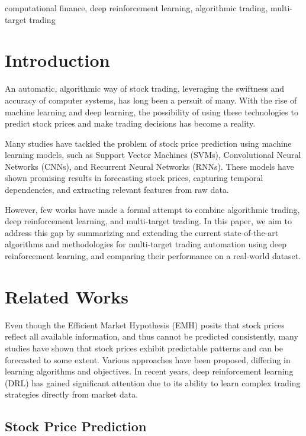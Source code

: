 \documentclass[conference]{IEEEtran}
\begin{document}
\begin{IEEEkeywords}
  computational finance, deep reinforcement learning, algorithmic trading, multi-target trading
\end{IEEEkeywords}

\section{Introduction}

An automatic, algorithmic way of stock trading, leveraging the swiftness and accuracy of computer systems, has long been a persuit of many. With the rise of machine learning and deep learning, the possibility of using these technologies to predict stock prices and make trading decisions has become a reality.

Many studies have tackled the problem of stock price prediction using machine learning models, such as Support Vector Machines (SVMs), Convolutional Neural Networks (CNNs), and Recurrent Neural Networks (RNNs). These models have shown promising results in forecasting stock prices, capturing temporal dependencies, and extracting relevant features from raw data.

However, few works have made a formal attempt to combine algorithmic trading, deep reinforcement learning, and multi-target trading. In this paper, we aim to address this gap by summarizing and extending the current state-of-the-art algorithms and methodologies for multi-target trading automation using deep reinforcement learning, and comparing their performance on a real-world dataset.

\section{Related Works}

Even though the Efficient Market Hypothesis (EMH) posits that stock prices reflect all available information, and thus cannot be predicted consistently, many studies have shown that stock prices exhibit predictable patterns and can be forecasted to some extent. Various approaches have been proposed, differing in learning algorithms and objectives. In recent years, deep reinforcement learning (DRL) has gained significant attention due to its ability to learn complex trading strategies directly from market data.

\subsection{Stock Price Prediction}
\end{document}
